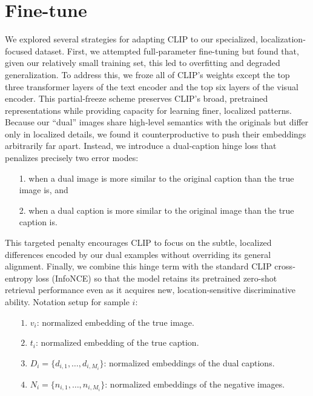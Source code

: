 \documentclass[11pt,letterpaper]{article}
\begin{document}
\noindent
\section{Fine-tune}

We explored several strategies for adapting CLIP to our specialized, localization‐focused dataset. First, we attempted full‐parameter fine-tuning but found that, given our relatively small training set, this led to overfitting and degraded generalization. To address this, we froze all of CLIP’s weights except the top three transformer layers of the text encoder and the top six layers of the visual encoder. This partial‐freeze scheme preserves CLIP’s broad, pretrained representations while providing capacity for learning finer, localized patterns.
Because our “dual” images share high‐level semantics with the originals but differ only in localized details, we found it counterproductive to push their embeddings arbitrarily far apart. Instead, we introduce a dual‐caption hinge loss that penalizes precisely two error modes:

\begin{itemize}
  \item[1.] when a dual image is more similar to the original caption than the true image is, and
  \item[2.] when a dual caption is more similar to the original image than the true caption is.
\end{itemize}


This targeted penalty encourages CLIP to focus on the subtle, localized differences encoded by our dual examples without overriding its general alignment. Finally, we combine this hinge term with the standard CLIP cross‐entropy loss (InfoNCE) so that the model retains its pretrained zero-shot retrieval performance even as it acquires new, location‐sensitive discriminative ability.
  Notation setup for sample \(i\):
    \begin{itemize}
      \item[\(\,1.\)] \(v_i\): normalized embedding of the true image.
      \item[\(\,2.\)] \(t_i\): normalized embedding of the true caption.
      \item[\(\,3.\)] \(D_i = \{d_{i,1}, \ldots, d_{i,M_i}\}\): normalized embeddings of the dual captions.
      \item[\(\,4.\)] \(N_i = \{n_{i,1}, \ldots, n_{i,M_i}\}\): normalized embeddings of the negative images.
    \end{itemize}
\end{document}
